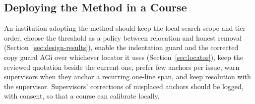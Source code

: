 \subsection{Deploying the Method in a Course}
An institution adopting the method should keep the local search scope and tier order, choose the threshold as a policy between relocation and honest removal (Section~\ref{sec:design-results}), enable the indentation guard and the corrected copy guard AGi over whichever locator it uses (Section~\ref{sec:locator}), keep the reviewed quotation beside the current one, prefer few anchors per issue, warn supervisors when they anchor a recurring one-line span, and keep resolution with the supervisor. Supervisors' corrections of misplaced anchors should be logged, with consent, so that a course can calibrate locally.
